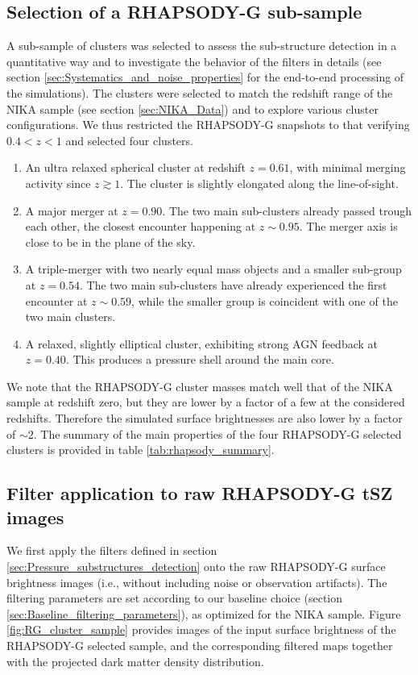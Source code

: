 \documentclass[twocolumn,traditabstract]{aa}
\begin{document}
\subsection{Selection of a RHAPSODY-G sub-sample}\label{sec:Selection_of_a_RHAPSODY-G_sub-sample}
A sub-sample of clusters was selected to assess the sub-structure detection in a quantitative way and to investigate the behavior of the filters in details (see section \ref{sec:Systematics_and_noise_properties} for the end-to-end processing of the simulations). The clusters were selected to match the redshift range of the NIKA sample (see section \ref{sec:NIKA_Data}) and to explore various cluster configurations. We thus restricted the RHAPSODY-G snapshots to that verifying $0.4 < z < 1$ and selected four clusters.
\begin{enumerate}
\item An ultra relaxed spherical cluster at redshift $z = 0.61$, with minimal merging activity since $z \gtrsim 1$. The cluster is slightly elongated along the line-of-sight.
\item A major merger at $z = 0.90$. The two main sub-clusters already passed trough each other, the closest encounter happening at $z \sim 0.95$. The merger axis is close to be in the plane of the sky. 
\item A triple-merger with two nearly equal mass objects and a smaller sub-group at $z = 0.54$. The two main sub-clusters have already experienced the first encounter at $z \sim 0.59$, while the smaller group is coincident with one of the two main clusters.
\item A relaxed, slightly elliptical cluster, exhibiting strong AGN feedback at $z = 0.40$. This produces a pressure shell around the main core.
\end{enumerate}
We note that the RHAPSODY-G cluster masses match well that of the NIKA sample at redshift zero, but they are lower by a factor of a few at the considered redshifts. Therefore the simulated surface brightnesses are also lower by a factor of $\sim 2$. The summary of the main properties of the four RHAPSODY-G selected clusters is provided in table \ref{tab:rhapsody_summary}.

\subsection{Filter application to raw RHAPSODY-G tSZ images}
We first apply the filters defined in section \ref{sec:Pressure_substructures_detection} onto the raw RHAPSODY-G surface brightness images (i.e., without including noise or observation artifacts). The filtering parameters are set according to our baseline choice (section \ref{sec:Baseline_filtering_parameters}), as optimized for the NIKA sample. Figure \ref{fig:RG_cluster_sample} provides images of the input surface brightness of the RHAPSODY-G selected sample, and the corresponding filtered maps together with the projected dark matter density distribution. 
\end{document}
